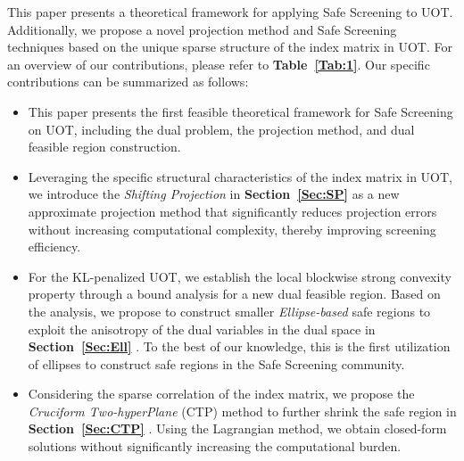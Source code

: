 \documentclass[11pt]{article}
\begin{document}
This paper presents a theoretical framework for applying Safe Screening to UOT. Additionally, we propose a novel projection method and Safe Screening techniques based on the unique sparse structure of the index matrix in UOT. For an overview of our contributions, please refer to \textbf{Table~\ref{Tab:1}}. Our specific contributions can be summarized as follows:

\begin{itemize}
\item This paper presents the first feasible theoretical framework for Safe Screening on UOT, including the dual problem, the projection method, and dual feasible region construction.
\item Leveraging the specific structural characteristics of the index matrix in UOT, we introduce the {\it Shifting Projection} in {\bf Section~\ref{Sec:SP} }as a new approximate projection method that significantly reduces projection errors without increasing computational complexity, thereby improving screening efficiency.
\item For the KL-penalized UOT, we establish the local blockwise strong convexity property through a bound analysis for a new dual feasible region. Based on the analysis, we propose to construct smaller {\it Ellipse-based} safe regions to exploit the anisotropy of the dual variables in the dual space in {\bf Section~\ref{Sec:Ell} }. To the best of our knowledge, this is the first utilization of ellipses to construct safe regions in the Safe Screening community.
\item Considering the sparse correlation of the index matrix, we propose the {\it Cruciform Two-hyperPlane} (CTP) method to further shrink the safe region in {\bf Section~\ref{Sec:CTP} }. Using the Lagrangian method, we obtain closed-form solutions without significantly increasing the computational burden.
\end{itemize}
\end{document}
